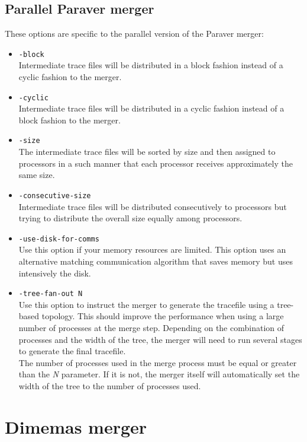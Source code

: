 \subsection{Parallel Paraver merger}

These options are specific to the parallel version of the Paraver merger:

\begin{itemize}
 \item {\tt -block}\\
  Intermediate trace files will be distributed in a block fashion instead of a cyclic fashion to the merger.
 \item {\tt -cyclic}\\
	Intermediate trace files will be distributed in a cyclic fashion instead of a block fashion to the merger.
 \item {\tt -size}\\
	The intermediate trace files will be sorted by size and then assigned to processors in a such manner that each processor receives approximately the same size.
 \item {\tt -consecutive-size}\\
	Intermediate trace files will be distributed consecutively to processors but trying to distribute the overall size equally among processors.
 \item {\tt -use-disk-for-comms}\\
 Use this option if your memory resources are limited. This option uses an alternative matching communication algorithm that saves memory but uses intensively the disk.
 \item{\tt -tree-fan-out N}\\
  Use this option to instruct the merger to generate the tracefile using a tree-based topology. This should improve the performance when using a large number of processes at the merge step. Depending on the combination of processes and the width of the tree, the merger will need to run several stages to generate the final tracefile.\\
  The number of processes used in the merge process must be equal or greater than the {\em N} parameter. If it is not, the merger itself will automatically set the width of the tree to the number of processes used.
\end{itemize}

\section{Dimemas merger}


